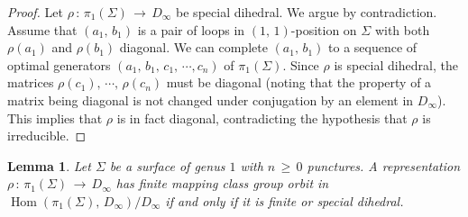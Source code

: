 \documentclass[reqno]{amsart}
\theoremstyle{plain}
\newtheorem{lemma}[theorem]{Lemma}
\theoremstyle{definition}
\theoremstyle{remark}
\DeclareMathOperator{\Hom}{Hom}
\begin{document}
\begin{proof}
Let $\rho\,:\,\pi_1(\Sigma)\,\to\, D_\infty$ be special dihedral. We argue by contradiction. Assume that 
$(a_1,\,b_1)$ is a pair of loops in $(1,\,1)$-position on $\Sigma$ with both $\rho(a_1)$ and 
$\rho(b_1)$ diagonal. We can complete $(a_1,\,b_1)$ to a sequence of optimal generators 
$(a_1,\,b_1,\,c_1,\,\cdots,c_n)$ of $\pi_1(\Sigma)$. Since $\rho$ is special dihedral, the matrices 
$\rho(c_1),\,\cdots,\,\rho(c_n)$ must be diagonal (noting that the property of a matrix  being diagonal is not 
changed under conjugation by an element in $D_\infty$). This implies that $\rho$ is in fact 
diagonal, contradicting the hypothesis that $\rho$ is irreducible.
\end{proof}

\begin{lemma}
\label{dilem}
Let $\Sigma$ be a surface of genus $1$ with $n\,\geq\,0$ punctures. A representation $\rho\,:\,\pi_1(\Sigma)\,\to
\,D_\infty$ has finite mapping class group orbit in $\Hom(\pi_1(\Sigma),\,D_\infty)/D_\infty$ if and only
if it is finite or special dihedral.
\end{lemma}
\end{document}
